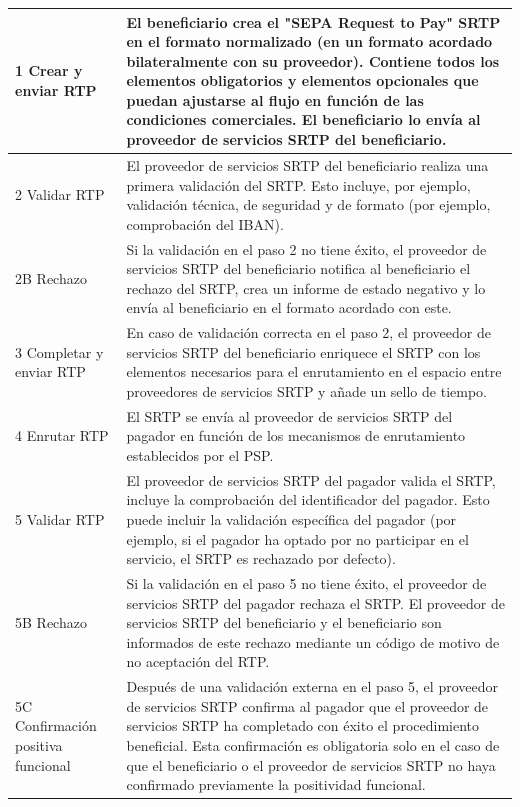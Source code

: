 \begin{longtable}{|p{3cm}|p{12cm}|}
  1 Crear y enviar RTP & El beneficiario crea el "SEPA Request to Pay" SRTP en el formato normalizado (en un formato acordado bilateralmente con su proveedor). Contiene todos los elementos obligatorios y elementos opcionales que puedan ajustarse al flujo en función de las condiciones comerciales. El beneficiario lo envía al proveedor de servicios SRTP del beneficiario. \\
  \hline
  2 Validar RTP & El proveedor de servicios SRTP del beneficiario realiza una primera validación del SRTP. Esto incluye, por ejemplo, validación técnica, de seguridad y de formato (por ejemplo, comprobación del IBAN). \\
  \hline
  2B Rechazo & Si la validación en el paso 2 no tiene éxito, el proveedor de servicios SRTP del beneficiario notifica al beneficiario el rechazo del SRTP, crea un informe de estado negativo y lo envía al beneficiario en el formato acordado con este. \\
  \hline
  3 Completar y enviar RTP & En caso de validación correcta en el paso 2, el proveedor de servicios SRTP del beneficiario enriquece el SRTP con los elementos necesarios para el enrutamiento en el espacio entre proveedores de servicios SRTP y añade un sello de tiempo. \\
  \hline
  4 Enrutar RTP & El SRTP se envía al proveedor de servicios SRTP del pagador en función de los mecanismos de enrutamiento establecidos por el PSP. \\
  \hline
  5 Validar RTP & El proveedor de servicios SRTP del pagador valida el SRTP, incluye la comprobación del identificador del pagador. Esto puede incluir la validación específica del pagador (por ejemplo, si el pagador ha optado por no participar en el servicio, el SRTP es rechazado por defecto). \\
  \hline
  5B Rechazo & Si la validación en el paso 5 no tiene éxito, el proveedor de servicios SRTP del pagador rechaza el SRTP. El proveedor de servicios SRTP del beneficiario y el beneficiario son informados de este rechazo mediante un código de motivo de no aceptación del RTP. \\
  \hline
  5C Confirmación positiva funcional & Después de una validación externa en el paso 5, el proveedor de servicios SRTP confirma al pagador que el proveedor de servicios SRTP ha completado con éxito el procedimiento beneficial. Esta confirmación es obligatoria solo en el caso de que el beneficiario o el proveedor de servicios SRTP no haya confirmado previamente la positividad funcional. \\

\end{longtable}
